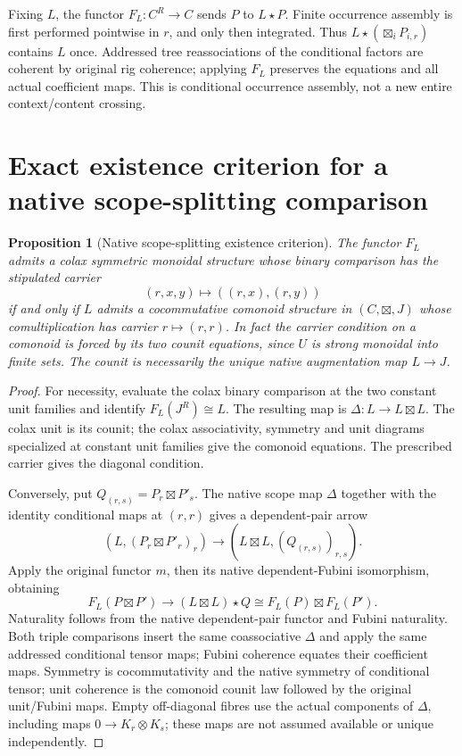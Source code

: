 \documentclass{article}
\newtheorem{proposition}{Proposition}
\begin{document}
Fixing $L$, the functor $F_L:C^R\to C$ sends $P$ to $L\star P$. Finite occurrence assembly is first performed pointwise in $r$, and only then integrated. Thus $L\star(\boxtimes_iP_{i,r})$ contains $L$ once. Addressed tree reassociations of the conditional factors are coherent by original rig coherence; applying $F_L$ preserves the equations and all actual coefficient maps. This is conditional occurrence assembly, not a new entire context/content crossing.

\section{Exact existence criterion for a native scope-splitting comparison}
\begin{proposition}[Native scope-splitting existence criterion]
The functor $F_L$ admits a colax symmetric monoidal structure whose binary comparison has the stipulated carrier
\[
 (r,x,y)\longmapsto((r,x),(r,y))
\]
if and only if $L$ admits a cocommutative comonoid structure in $(C,\boxtimes,J)$ whose comultiplication has carrier $r\mapsto(r,r)$. In fact the carrier condition on a comonoid is forced by its two counit equations, since $U$ is strong monoidal into finite sets. The counit is necessarily the unique native augmentation map $L\to J$.
\end{proposition}
\begin{proof}
For necessity, evaluate the colax binary comparison at the two constant unit families and identify $F_L(J^R)\cong L$. The resulting map is $\Delta:L\to L\boxtimes L$. The colax unit is its counit; the colax associativity, symmetry and unit diagrams specialized at constant unit families give the comonoid equations. The prescribed carrier gives the diagonal condition.

Conversely, put $Q_{(r,s)}=P_r\boxtimes P'_s$. The native scope map $\Delta$ together with the identity conditional maps at $(r,r)$ gives a dependent-pair arrow
\[
 (L,(P_r\boxtimes P'_r)_r)\longrightarrow
 (L\boxtimes L,(Q_{(r,s)})_{r,s}).
\]
Apply the original functor $m$, then its native dependent-Fubini isomorphism, obtaining
\[
 F_L(P\boxtimes P')\longrightarrow
 (L\boxtimes L)\star Q\cong F_L(P)\boxtimes F_L(P').
\]
Naturality follows from the native dependent-pair functor and Fubini naturality. Both triple comparisons insert the same coassociative $\Delta$ and apply the same addressed conditional tensor maps; Fubini coherence equates their coefficient maps. Symmetry is cocommutativity and the native symmetry of conditional tensor; unit coherence is the comonoid counit law followed by the original unit/Fubini maps. Empty off-diagonal fibres use the actual components of $\Delta$, including maps $0\to K_r\otimes K_s$; these maps are not assumed available or unique independently.
\end{proof}
\end{document}
